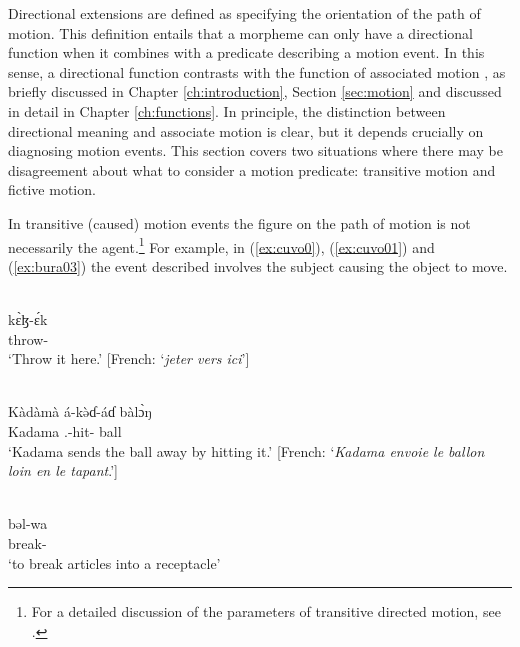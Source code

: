 Directional extensions are defined as specifying the orientation of the path of motion. This definition entails that a morpheme can only have a directional function when it combines with a predicate describing a motion event. In this sense, a directional function contrasts with the function of associated motion \citep{guillaumeAssociatedMotionSouth2016}, as briefly discussed in Chapter \ref{ch:introduction}, Section \ref{sec:motion} and discussed in detail in Chapter \ref{ch:functions}. In principle, the distinction between directional meaning and associate motion is clear, but it depends crucially on diagnosing motion events. This section covers two situations where there may be disagreement about what to consider a motion predicate: transitive motion and fictive motion. 
	
In transitive (caused) motion events the figure on the path of motion is not necessarily the agent.\footnote{For a detailed discussion of the parameters of transitive directed motion, see \citet{osswaldDescriptionTransitiveDirected2022}.} For example, in (\ref{ex:cuvo0}), (\ref{ex:cuvo01}) and (\ref{ex:bura03}) the event described involves the subject causing the object to move.
	
	\ea\label{ex:cuvo0}
	 \\
	\gll kɛ̀ɮ-ɛ́k	\\
	throw-	\\
	\glt `Throw it here.' [French: `\textit{jeter vers ici}']
	
	\ex\label{ex:cuvo01}
	 \\
	\gll Kàdàmà á-kə̀ɗ-áɗ bàlɔ̀ŋ	\\
	Kadama .-hit- ball	\\
	\glt `Kadama sends the ball away by hitting it.' [French: `\textit{Kadama envoie le ballon loin en le tapant}.']
	
	\ex\label{ex:bura03}
	 \\
	\gll bəl-wa	\\
	break-		\\
	\glt `to break articles into a receptacle'
	\z 
	
